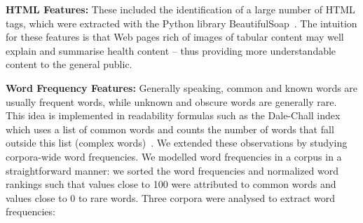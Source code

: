 \textbf{HTML Features:}
These included the identification of a large number of HTML tags, which were extracted with the Python library BeautifulSoap~\cite{bs4}. The intuition for these features is that Web pages rich of images of tabular content may well explain and summarise health content -- thus providing more understandable content to the general public. 


\textbf{Word Frequency Features:}
Generally speaking, common and known words are usually frequent words, while unknown and obscure words are generally rare. This idea is implemented in readability formulas such as the Dale-Chall index which uses a list of common words and counts the number of words that fall outside this list (complex words)~\cite{dale48}.
We extended these observations by studying corpora-wide word frequencies. 
We modelled word frequencies in a corpus in a straightforward manner: we sorted the word frequencies and normalized word rankings such that values close to 100 were attributed to common words and values close to 0 to rare words. Three corpora were analysed to extract word frequencies:


